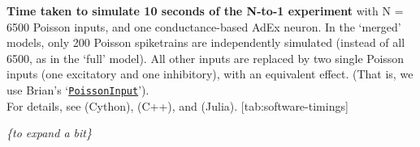 \begin{table}[h]
    \begin{sidecaption}
        {\textbf{Time taken to simulate 10 seconds of the N-to-1 experiment}
        {\small with N = 6500 Poisson inputs, and one conductance-based AdEx neuron. In the `merged' models, only 200 Poisson spiketrains are independently simulated (instead of all 6500, as in the `full' model). All other inputs are replaced by two single Poisson inputs (one excitatory and one inhibitory), with an equivalent effect. (That is, we use Brian's `\texttt{\href{https://brian2.readthedocs.io/en/stable/user/input.html\#efficient-poisson-inputs-via-poissoninput}{PoissonInput}}').\\
        For details, see  (Cython),  (C++), and  (Julia).}
        }
        [tab:software-timings]
    \end{sidecaption}
\end{table}


\emph{\{to expand a bit\}}
